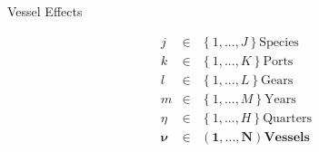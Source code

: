 \documentclass[ xcolor = pdftex, dvipsnames, table ]{beamer}
\begin{document}
\begin{frame}{Vessel Effects}
\begin{minipage}[h!]{0.39\textwidth}
\end{minipage}
\begin{minipage}{0.3\textwidth}
\begin{eqnarray*}
j &\in&\left\{1, ..., J\right\} \text{Species}\\
k &\in&\left\{1, ..., K\right\} \text{Ports}\\
l &\in&\left\{1, ..., L\right\} \text{Gears}\\
m &\in&\left\{1, ..., M\right\} \text{Years}\\
\eta &\in&\left\{1, ..., H\right\} \text{Quarters}\\
\bm{\nu} &\bm{\in}&\bm{\left(1, ..., N\right)} \textbf{Vessels}
\end{eqnarray*}
\end{minipage}
\end{frame}

%
%
\end{document}
